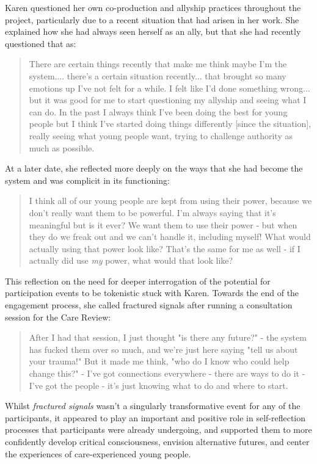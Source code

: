 Karen questioned her own co-production and allyship practices throughout the project, particularly due to a recent situation that had arisen in her work. She explained how she had always seen herself as an ally, but that she had recently questioned that as:
\begin{quote}
There are certain things recently that make me think maybe I'm the system.... there's a certain situation recently... that brought so many emotions up I've not felt for a while. I felt like I'd done something wrong... but it was good for me to start questioning my allyship and seeing what I can do. In the past I always think I've been doing the best for young people but I think I've started doing things differently [since the situation], really seeing what young people want, trying to challenge authority as much as possible.
\end{quote}
At a later date, she reflected more deeply on the ways that she had become the system and was complicit in its functioning:
\begin{quote}
I think all of our young people are kept from using their power, because we don't really want them to be powerful. I'm always saying that it's meaningful but is it ever? We want them to use their power - but when they do we freak out and we can't handle it, including myself! What would actually using that power look like? That's the same for me as well - if I actually did use \textit{my} power, what would that look like? 
\end{quote}
This reflection on the need for deeper interrogation of the potential for participation events to be tokenistic stuck with Karen. Towards the end of the engagement process, she called fractured signals after running a consultation session for the Care Review:
\begin{quote}
After I had that session, I just thought "is there any future?" - the system has fucked them over so much,  and we're just here saying "tell us about your trauma!" But it made me think, "who do I know who could help change this?" - I've got connections everywhere - there are ways to do it - I've got the people - it's just knowing what to do and where to start.
\end{quote}
Whilst \textit{fractured signals} wasn't a singularly transformative event for any of the participants, it appeared to play an important and positive role in self-reflection processes that participants were already undergoing, and supported them to more confidently develop critical consciousness, envision alternative futures, and center the experiences of care-experienced young people. 

